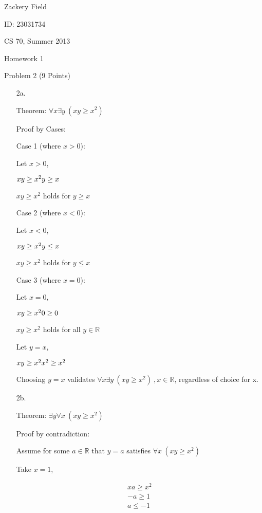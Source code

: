 \documentclass[11pt,letterpaper]{article}
\begin{document}
Zackery Field

ID: 23031734

CS 70, Summer 2013

Homework 1 

Problem 2 (9 Points)
\bigskip

\begin{enumerate}
\item[2a.] 

Theorem:
$\forall x \exists y \: (xy \geq x^2)$ 

\bigskip

Proof by Cases:

\bigskip
Case 1 (where $ x > 0 $):

Let $x > 0 $,

$ xy \geq x^2 \\
y \geq x$

$xy \geq x^2 $ holds for $y \geq x$

\bigskip
Case 2 (where $ x < 0 $): 

Let $x < 0 $,

$xy \geq x^2 \\
y \leq x$

$xy \geq x^2 $ holds for $y \leq x$

\bigskip
Case 3 (where $ x = 0 $):

Let $x = 0 $,

$xy \geq x^2 \\
0 \geq 0$

$xy \geq x^2 $ holds for all $y \in \mathbb{R} $

\bigskip
Let $y = x$,

$xy \geq x^2 \\
x^2 \geq x^2$

Choosing $y = x$ validates $\forall x \exists y \: (xy \geq x^2) \:, x \in \mathbb{R} $, regardless of choice for x.

\bigskip
\item[2b.] 

Theorem: 
$ \exists y \forall x \: (xy \geq x^2)$
 
Proof by contradiction:

Assume for some $ a \in \mathbb{R} $ that $y = a$ satisfies  $ \forall x \: (xy \geq x^2)$

Take $x = 1$,

\begin{eqnarray}
xa \geq x^2 \\
-a \geq 1 \\
a \leq -1
\end{eqnarray} 


\end{enumerate}
\end{document}
